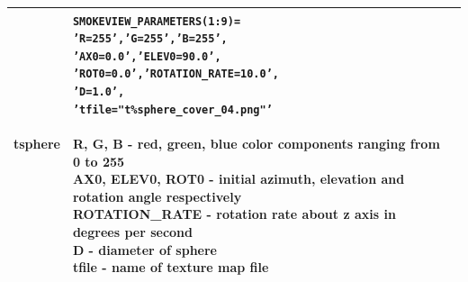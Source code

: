 \begin{longtable}[ht]{|l|l|c|}
tsphere&
\parbox[c]{\boxwidth}{
    {\tt SMOKEVIEW\_PARAMETERS(1:9)=}\\
    {\tt 'R=255','G=255','B=255',}\\
    {\tt 'AX0=0.0','ELEV0=90.0',}\\
    {\tt 'ROT0=0.0','ROTATION\_RATE=10.0',}\\
    {\tt 'D=1.0',}\\
    {\tt 'tfile="t\%sphere\_cover\_04.png"'}\\ \\
R, G, B - red, green, blue color components ranging from 0 to 255\\
AX0, ELEV0, ROT0 - initial azimuth, elevation and rotation angle respectively\\
ROTATION\_RATE - rotation rate about z axis in degrees per second\\
D - diameter of sphere \\
tfile - name of texture map file

} &
 \\ \hline


\end{longtable}
